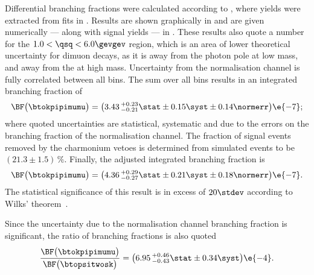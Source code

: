 Differential branching fractions were calculated according to , where yields
were extracted from fits in .
Results are shown graphically in  and are given numerically --- along
with signal yields --- in .
These results also quote a number for the $1.0<\qsq<6.0\gevgev$ region, which is an area of lower
theoretical uncertainty for dimuon \fcnc decays, as it is away from the photon pole at low mass,
and away from the \jpsi at high mass.
Uncertainty from the normalisation channel is fully correlated between all \qsq bins.
The sum over all \qsq bins results in an integrated branching fraction of
\begin{equation*}
  \BF\big( \btokpipimumu \big)=
  \big(3.43\,^{+0.23}_{-0.21}\stat\pm0.15\syst\pm0.14\normerr\big)\e{-7};
\end{equation*}
where quoted uncertainties are statistical, systematic and due to the errors on the branching
fraction of the normalisation channel.
The fraction of signal events removed by the charmonium vetoes is determined from simulated
 events %
to be $(21.3\pm1.5)\,\%$.
Finally, the adjusted integrated branching fraction is
\begin{equation*}
  \BF\big( \btokpipimumu \big)=
  \big(4.36\,^{+0.29}_{-0.27}\stat\pm0.21\syst\pm0.18\normerr\big)\e{-7}.
\end{equation*}
The statistical significance of this result is in excess of $20\stdev$ according to Wilks'
theorem~\cite{wilks1938}.

Since the uncertainty due to the normalisation channel branching fraction is significant, the
ratio of branching fractions is also quoted
\begin{equation*}
  \frac{ \BF\big( \btokpipimumu \big) }{ \BF\big( \btopsitwosk \big) } =
  \big(6.95\,^{+0.46}_{-0.43}\stat\pm0.34\syst\big)\e{-4}.
\end{equation*}

